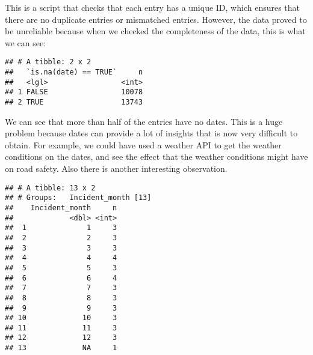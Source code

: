\documentclass[
]{book}
\newenvironment{Shaded}{\begin{snugshade}}{\end{snugshade}}
\newcommand{\DataTypeTok}[1]{\textcolor[rgb]{0.13,0.29,0.53}{#1}}
\newcommand{\KeywordTok}[1]{\textcolor[rgb]{0.13,0.29,0.53}{\textbf{#1}}}
\newcommand{\NormalTok}[1]{#1}
\newcommand{\OperatorTok}[1]{\textcolor[rgb]{0.81,0.36,0.00}{\textbf{#1}}}
\newcommand{\OtherTok}[1]{\textcolor[rgb]{0.56,0.35,0.01}{#1}}
\newcommand{\StringTok}[1]{\textcolor[rgb]{0.31,0.60,0.02}{#1}}
\begin{document}
This is a script that checks that each entry has a unique ID, which ensures that there are no duplicate entries or mismatched entries. However, the data proved to be unreliable because when we checked the completeness of the data, this is what we can see:

\begin{Shaded}
\end{Shaded}

\begin{verbatim}
## # A tibble: 2 x 2
##   `is.na(date) == TRUE`     n
##   <lgl>                 <int>
## 1 FALSE                 10078
## 2 TRUE                  13743
\end{verbatim}

We can see that more than half of the entries have no dates. This is a huge problem because dates can provide a lot of insights that is now very difficult to obtain. For example, we could have used a weather API to get the weather conditions on the dates, and see the effect that the weather conditions might have on road safety. Also there is another interesting observation.

\begin{Shaded}
\end{Shaded}

\begin{verbatim}
## # A tibble: 13 x 2
## # Groups:   Incident_month [13]
##    Incident_month     n
##             <dbl> <int>
##  1              1     3
##  2              2     3
##  3              3     3
##  4              4     4
##  5              5     3
##  6              6     4
##  7              7     3
##  8              8     3
##  9              9     3
## 10             10     3
## 11             11     3
## 12             12     3
## 13             NA     1
\end{verbatim}
\end{document}
